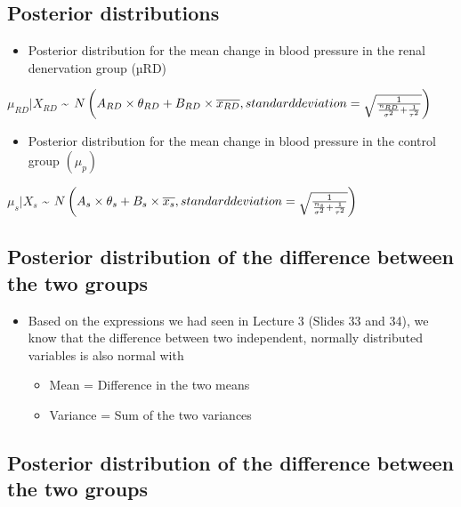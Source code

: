 \documentclass[
]{book}
\providecommand{\tightlist}{%
  \setlength{\itemsep}{0pt}\setlength{\parskip}{0pt}}
\begin{document}
\hypertarget{posterior-distributions}{%
\subsection{Posterior distributions}\label{posterior-distributions}}

\begin{itemize}
\tightlist
\item
  Posterior distribution for the mean change in blood pressure in the renal denervation group (µRD)
\end{itemize}

\(\mu_{RD}|X_{RD}\) \textasciitilde{} \(N\left(A_{RD}\times\theta_{RD}+B_{RD}\times\overline{x_{RD}},standard\space deviation=\sqrt{\frac{1}{\frac{n_{RD}}{\sigma^2}+\frac{1}{\tau^2}}}\right)\)

\begin{itemize}
\tightlist
\item
  Posterior distribution for the mean change in blood pressure in the control group \((\mu_p)\)
\end{itemize}

\(\mu_{s}|X_{s}\) \textasciitilde{} \(N\left(A_{s}\times\theta_{s}+B_{s}\times\overline{x_{s}},standard\space deviation=\sqrt{\frac{1}{\frac{n_{s}}{\sigma^2}+\frac{1}{\tau^2}}}\right)\)

\hypertarget{posterior-distribution-of-the-difference-between-the-two-groups}{%
\subsection{Posterior distribution of the difference between the two groups}\label{posterior-distribution-of-the-difference-between-the-two-groups}}

\begin{itemize}
\tightlist
\item
  Based on the expressions we had seen in Lecture 3 (Slides 33 and 34), we know that the difference between two independent, normally distributed variables is also normal with

  \begin{itemize}
  \tightlist
  \item
    Mean = Difference in the two means
  \item
    Variance = Sum of the two variances
  \end{itemize}
\end{itemize}

\hypertarget{posterior-distribution-of-the-difference-between-the-two-groups-1}{%
\subsection{Posterior distribution of the difference between the two groups}\label{posterior-distribution-of-the-difference-between-the-two-groups-1}}
\end{document}
